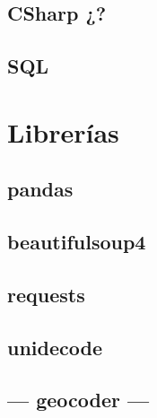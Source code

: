 \subsection{CSharp ¿?}

\subsection{SQL}

\section{Librerías}

\subsection{pandas}
\subsection{beautifulsoup4}
\subsection{requests}
\subsection{unidecode}
\subsection{--- geocoder ---}


